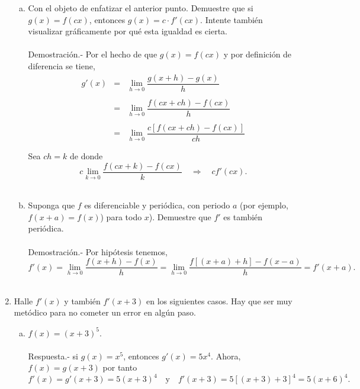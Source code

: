\begin{enumerate}[\bfseries 1]
\begin{enumerate}[(a)]
	    \item Con el objeto de enfatizar el anterior punto. Demuestre que si $g(x)=f(cx)$, entonces $g(x)=c\cdot f'(cx)$. Intente también visualizar gráficamente por qué esta igualdad es cierta.\\\\
		Demostración.-\; Por el hecho de que $g(x)=f(cx)$ y por definición de diferencia se tiene,
		$$\begin{array}{rcl}
		    g'(x)&=&\lim\limits_{h\to 0}\dfrac{g(x+h)-g(x)}{h}\\\\
			 &=&\lim\limits_{h\to 0}\dfrac{f(cx+ch)-f(cx)}{h}\\\\
			 &=&\lim\limits_{h\to 0}\dfrac{c\left[f(cx+ch)-f(cx)\right]}{ch}\\\\
		\end{array}$$
		Sea $ch=k$ de donde
		$$c\lim_{k\to 0}\dfrac{f(cx+k)-f(cx)}{k}\quad \Rightarrow \quad cf'(cx).$$\\

	    \item Suponga que $f$ es diferenciable y periódica, con periodo $a$ (por ejemplo, $f(x+a)=f(x)$) para todo $x$). Demuestre que $f'$ es también periódica.\\\\
		Demostración.-\; Por hipótesis tenemos,
		$$f'(x)=\lim_{h\to 0}\dfrac{f(x+h)-f(x)}{h} = \lim_{h\to 0}\dfrac{f\left[(x+a)+h\right]-f(x-a)}{h} = f'(x+a).$$\\

	\end{enumerate}

    \item Halle $f'(x)$ y también $f'(x+3)$ en los siguientes casos. Hay que ser muy metódico para no cometer un error en algún paso.\\

	\begin{enumerate}[(a)]

	    \item $f(x)=(x+3)^5$.\\\\
	    Respuesta.-\; si $g(x)=x^5$, entonces $g'(x)=5x^4$. Ahora, $f(x)=g(x+3)$ por tanto $$f'(x)=g'(x+3)=5(x+3)^4\quad  \mbox{y} \quad f'(x+3) = 5[(x+3)+3]^4 =5(x+6)^4.$$\\


\end{enumerate}
\end{enumerate}
